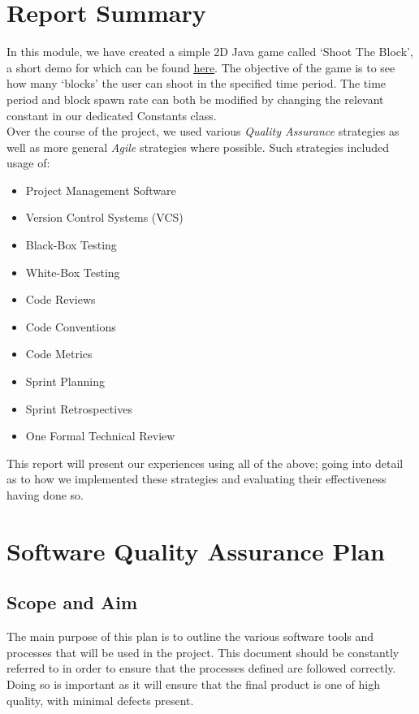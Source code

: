 \documentclass[12pt]{article}
\begin{document}
\tableofcontents
\label{toc}

\newpage

\section{Report Summary}

In this module, we have created a simple 2D Java game called `Shoot The Block', a short demo for which can be found \underline{\href{https://media.giphy.com/media/woCCylWbiKvxFW0PJP/giphy.gif}{here}}. The objective of the game is to see how many `blocks' the user can shoot in the specified time period. The time period and block spawn rate can both be modified by changing the relevant constant in our dedicated Constants class. \\


Over the course of the project, we used various \emph{Quality Assurance} strategies as well as more general \emph{Agile} strategies where possible. Such strategies included usage of: 

\begin{itemize}
    \item Project Management Software
    \item Version Control Systems (VCS)
    \item Black-Box Testing
    \item White-Box Testing
    \item Code Reviews
    \item Code Conventions
    \item Code Metrics
    \item Sprint Planning
    \item Sprint Retrospectives
    \item One Formal Technical Review
\end{itemize}

 This report will present our experiences using all of the above; going into detail as to how we implemented these strategies and evaluating their effectiveness having done so.
 
 \newpage
 
 \section{Software Quality Assurance Plan}
 
 \subsection{Scope and Aim}
 The main purpose of this plan is to outline the various software tools and processes that will be used in the project. This document should be constantly referred to in order to ensure that the processes defined are followed correctly. Doing so is important as it will ensure that the final product is one of high quality, with minimal defects present. 
 
\end{document}
